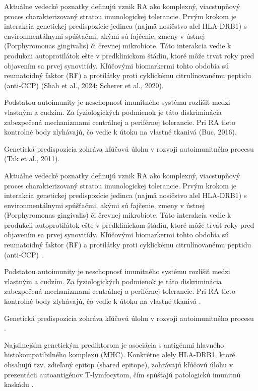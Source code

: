 Aktuálne vedecké poznatky definujú vznik RA ako komplexný, viacstupňový proces charakterizovaný stratou imunologickej tolerancie. Prvým krokom je interakcia genetickej predispozície jedinca (najmä nosičstvo alel HLA-DRB1) s environmentálnymi spúšťačmi, akými sú fajčenie, zmeny v ústnej (Porphyromonas gingivalis) či črevnej mikrobiote. Táto interakcia vedie k produkcii autoprotilátok ešte v predklinickom štádiu, ktoré môže trvať roky pred objavením sa prvej synovitídy. Kľúčovými biomarkermi tohto obdobia sú reumatoidný faktor (RF) a protilátky proti cyklickému citrulínovanému peptidu (anti-CCP) (Shah et al., 2024; Scherer et al., 2020). 



Podstatou autoimunity je neschopnosť imunitného systému rozlíšiť medzi vlastným a cudzím. Za fyziologických podmienok je táto diskriminácia zabezpečená mechanizmami centrálnej a periférnej tolerancie. Pri RA tieto kontrolné body zlyhávajú, čo vedie k útoku na vlastné tkanivá (Buc, 2016). 

Genetická predispozícia zohráva kľúčovú úlohu v rozvoji autoimunitného procesu (Tak et al., 2011). 

Aktuálne vedecké poznatky definujú vznik RA ako komplexný, viacstupňový proces charakterizovaný stratou imunologickej tolerancie. Prvým krokom je interakcia genetickej predispozície jedinca (najmä nosičstvo alel HLA-DRB1) s environmentálnymi spúšťačmi, akými sú fajčenie, zmeny v ústnej (Porphyromonas gingivalis) či črevnej mikrobiote. Táto interakcia vedie k produkcii autoprotilátok ešte v predklinickom štádiu, ktoré môže trvať roky pred objavením sa prvej synovitídy. Kľúčovými biomarkermi tohto obdobia sú reumatoidný faktor (RF) a protilátky proti cyklickému citrulínovanému peptidu (anti-CCP) \parencite{Shah2024, Scherer2020}. 



Podstatou autoimunity je neschopnosť imunitného systému rozlíšiť medzi vlastným a cudzím. Za fyziologických podmienok je táto diskriminácia zabezpečená mechanizmami centrálnej a periférnej tolerancie. Pri RA tieto kontrolné body zlyhávajú, čo vedie k útoku na vlastné tkanivá \parencite{buc2016autoimunita}. 

Genetická predispozícia zohráva kľúčovú úlohu v rozvoji autoimunitného procesu \parencite{tak2011mechanisms}. 

Najsilnejším genetickým prediktorom je asociácia s antigénmi hlavného histokompatibilného komplexu (MHC). Konkrétne alely HLA-DRB1, ktoré obsahujú tzv. zdieľaný epitop (shared epitope), zohrávajú kľúčovú úlohu v prezentácii autoantigénov T-lymfocytom, čím spúšťajú patologickú imunitnú kaskádu \parencite{tak2011mechanisms}. 

